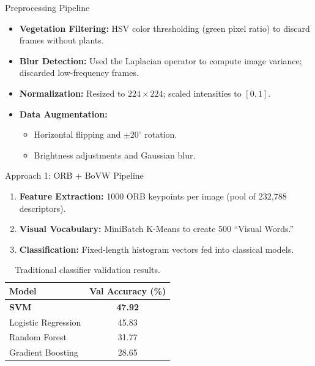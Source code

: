 \documentclass[10pt]{beamer}
\begin{document}
\begin{frame}{Preprocessing Pipeline}
    \begin{itemize}
        \item \textbf{Vegetation Filtering:} HSV color thresholding (green pixel ratio) to discard frames without plants.
        \item \textbf{Blur Detection:} Used the Laplacian operator to compute image variance; discarded low-frequency frames.
        \item \textbf{Normalization:} Resized to $224 \times 224$; scaled intensities to $[0, 1]$.
        \item \textbf{Data Augmentation:}
            \begin{itemize}
                \item Horizontal flipping and $\pm 20^\circ$ rotation.
                \item Brightness adjustments and Gaussian blur.
            \end{itemize}
    \end{itemize}
\end{frame}

\begin{frame}{Approach 1: ORB + BoVW Pipeline}
    \begin{enumerate}
        \item \textbf{Feature Extraction:} 1000 ORB keypoints per image (pool of 232,788 descriptors).
        \item \textbf{Visual Vocabulary:} MiniBatch K-Means to create 500 ``Visual Words.''
        \item \textbf{Classification:} Fixed-length histogram vectors fed into classical models.
    \end{enumerate}
    \begin{table}
        \centering
        \caption{Traditional classifier validation results.}
        \begin{tabular}{lc}
            \toprule
            \textbf{Model} & \textbf{Val Accuracy (\%)} \\
            \midrule
            \textbf{SVM} & \textbf{47.92} \\
            Logistic Regression & 45.83 \\
            Random Forest & 31.77 \\
            Gradient Boosting & 28.65 \\
            \bottomrule
        \end{tabular}
    \end{table}
\end{frame}
\end{document}
